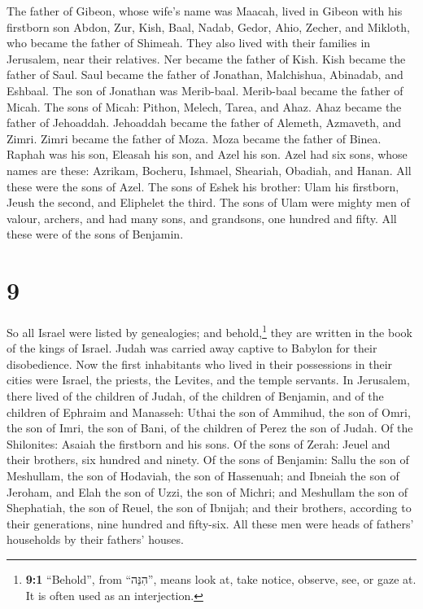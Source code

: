  The father of Gibeon, whose wife's name was Maacah,
lived in Gibeon  with his firstborn son Abdon, Zur, Kish,
Baal, Nadab,  Gedor, Ahio, Zecher,  and
Mikloth, who became the father of Shimeah. They also lived with their
families in Jerusalem, near their relatives.  Ner became
the father of Kish. Kish became the father of Saul. Saul became the
father of Jonathan, Malchishua, Abinadab, and Eshbaal. 
The son of Jonathan was Merib-baal. Merib-baal became the father of
Micah.  The sons of Micah: Pithon, Melech, Tarea, and
Ahaz.  Ahaz became the father of Jehoaddah. Jehoaddah
became the father of Alemeth, Azmaveth, and Zimri. Zimri became the
father of Moza.  Moza became the father of Binea. Raphah
was his son, Eleasah his son, and Azel his son.  Azel had
six sons, whose names are these: Azrikam, Bocheru, Ishmael, Sheariah,
Obadiah, and Hanan. All these were the sons of Azel.  The
sons of Eshek his brother: Ulam his firstborn, Jeush the second, and
Eliphelet the third.  The sons of Ulam were mighty men of
valour, archers, and had many sons, and grandsons, one hundred and
fifty. All these were of the sons of Benjamin.

\hypertarget{section-8}{%
\section{9}\label{section-8}}

 So all Israel were listed by genealogies; and
behold,\footnote{\textbf{9:1} ``Behold'', from ``הִנֵּה'', means look
  at, take notice, observe, see, or gaze at. It is often used as an
  interjection.} they are written in the book of the kings of Israel.
Judah was carried away captive to Babylon for their disobedience.
 Now the first inhabitants who lived in their possessions
in their cities were Israel, the priests, the Levites, and the temple
servants.  In Jerusalem, there lived of the children of
Judah, of the children of Benjamin, and of the children of Ephraim and
Manasseh:  Uthai the son of Ammihud, the son of Omri, the
son of Imri, the son of Bani, of the children of Perez the son of Judah.
 Of the Shilonites: Asaiah the firstborn and his sons.
 Of the sons of Zerah: Jeuel and their brothers, six
hundred and ninety.  Of the sons of Benjamin: Sallu the
son of Meshullam, the son of Hodaviah, the son of Hassenuah;
 and Ibneiah the son of Jeroham, and Elah the son of Uzzi,
the son of Michri; and Meshullam the son of Shephatiah, the son of
Reuel, the son of Ibnijah;  and their brothers, according
to their generations, nine hundred and fifty-six. All these men were
heads of fathers' households by their fathers' houses.

